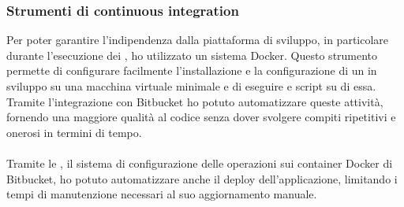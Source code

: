 		\subsubsection{Strumenti di continuous integration}
		Per poter garantire l'indipendenza dalla piattaforma di sviluppo, in particolare durante l'esecuzione dei , ho utilizzato un sistema \gls{Docker}. Questo strumento permette di configurare facilmente l'installazione e la configurazione di un  in sviluppo su una macchina virtuale minimale e di eseguire  e script su di essa. Tramite l'integrazione con Bitbucket ho potuto automatizzare queste attività, fornendo una maggiore qualità al codice senza dover svolgere compiti ripetitivi e onerosi in termini di tempo.
		\paragraph*{}
		Tramite le , il sistema di configurazione delle operazioni sui container \gls{Docker} di Bitbucket, ho potuto automatizzare anche il deploy dell'applicazione, limitando i tempi di manutenzione necessari al suo aggiornamento manuale.

